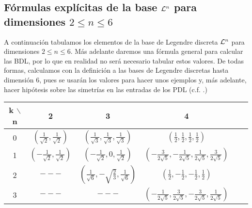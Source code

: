 \subsection{Fórmulas explícitas de la base $\mathcal{L}^{n}$ para dimensiones $2 \leq n \leq 6$} \label{subsect:Formulas explicitas}
\label{formulas explicitas para Ln con n de 2 hasta 6}

A continuación tabulamos los
elementos de la base de Legendre
discreta $\mathcal{L}^{n}$ para dimensiones
$2 \leq n \leq 6$.
Más adelante daremos una fórmula general para calcular
las BDL, por lo que en realidad no será necesario tabular estos valores.
De todas formas, calculamos con la definición
 a las bases de Legendre discretas hasta dimensión $6$, pues
se usarán los valores para hacer unos ejemplos y,
más adelante, hacer hipótesis sobre las simetrías en las entradas
de los PDL (c.f. .)


\begin{center}
\begin{tabular}{ c c c c c c }
k $\backslash$ n & 2 & 3 & 4   \\ 
\hline

0 & $\left(
\frac{1}{\sqrt{2}}, \frac{1}{\sqrt{2}}\right)$ & 
$\left(\frac{1}{\sqrt{3}}, \frac{1}{\sqrt{3}}, \frac{1}{\sqrt{3}} \right)$ & 
$\left(\frac{1}{2}, \frac{1}{2}, \frac{1}{2}, \frac{1}{2} \right)$ \\ 
1 & $\left(-\frac{1}{\sqrt{2}}, \frac{1}{\sqrt{2}}\right)$ & 
$\left(-\frac{1}{\sqrt{2}}, 0, \frac{1}{\sqrt{2}} \right) $ & 
$\left(-\frac{3}{2\sqrt{5}}, -\frac{1}{2\sqrt{5}}, \frac{1}{2\sqrt{5}}, \frac{3}{2\sqrt{5}} \right)$  \\ 
2 & $---$ & $\left(\frac{1}{\sqrt{6}}, -\sqrt{\frac{2}{3}}, \frac{1}{\sqrt{6}} \right) $ & 
$\left(\frac{1}{2}, -\frac{1}{2}, -\frac{1}{2}, \frac{1}{2} \right)$ \\ 
3 & $---$ & $---$ & 
$\left(-\frac{1}{2\sqrt{5}}, \frac{3}{2\sqrt{5}}, -\frac{3}{2\sqrt{5}}, \frac{1}{2\sqrt{5}} \right)$  \\ 
\end{tabular}
\end{center} 
 
